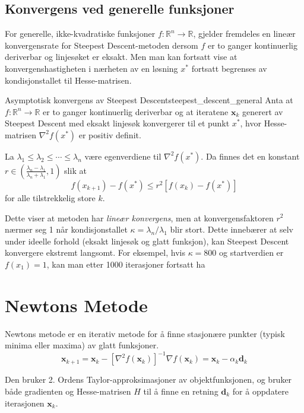 \subsection{Konvergens ved generelle funksjoner}
For generelle, ikke-kvadratiske funksjoner \(f : \mathbb{R}^n \to \mathbb{R}\), gjelder fremdeles en lineær konvergensrate for Steepest Descent-metoden dersom \(f\) er to ganger kontinuerlig deriverbar og linjesøket er eksakt.
Men man kan fortsatt vise at konvergenshastigheten i nærheten av en løsning \(x^\ast\) fortsatt begrenses av kondisjonstallet til Hesse-matrisen.

\begin{theorem}{Asymptotisk konvergens av Steepest Descent}{steepest_descent_general}
	Anta at \(f : \mathbb{R}^n \to \mathbb{R}\) er to ganger kontinuerlig deriverbar og at iteratene \(\symbf{x}_k\) generert av Steepest Descent med eksakt linjesøk konvergerer til et punkt \(x^\ast\), hvor Hesse-matrisen \(\nabla^2 f(x^\ast)\) er positiv definit.

	La \(\lambda_1 \leq \lambda_2 \leq \cdots \leq \lambda_n\) være egenverdiene til \(\nabla^2 f(x^\ast)\). Da finnes det en konstant \(r \in \left( \frac{\lambda_n - \lambda_1}{\lambda_n + \lambda_1}, 1 \right)\) slik at
	\[
		f(x_{k+1}) - f(x^\ast) \leq r^2 \left[ f(x_k) - f(x^\ast) \right]
	\]
	for alle tilstrekkelig store \(k\).
\end{theorem}

Dette viser at metoden har \emph{lineær konvergens}, men at konvergensfaktoren \(r^2\) nærmer seg 1 når kondisjonstallet \(\kappa = \lambda_n / \lambda_1\) blir stort. Dette innebærer at selv under ideelle forhold (eksakt linjesøk og glatt funksjon), kan Steepest Descent konvergere ekstremt langsomt. For eksempel, hvis \(\kappa = 800\) og startverdien er \(f(x_1) = 1\), kan man etter 1000 iterasjoner fortsatt ha

\section{Newtons Metode}
\label{sec:newtons_method}
Newtons metode er en iterativ metode for å finne stasjonære punkter (typisk minima eller maxima) av glatt funksjoner.
\[
	\mathbf{x}_{k+1} = \mathbf{x}_k - [\nabla^2 f(\mathbf{x}_k)]^{-1} \nabla f(\mathbf{x}_k) = \mathbf{x}_k - \alpha_k \mathbf{d}_k
\]\label{eq:newtons_method}

Den bruker 2. Ordens Taylor-approksimasjoner av objektfunksjonen, og bruker både gradienten og Hesse-matrisen $H$ til å finne en retning $\symbf{d}_k$ for å oppdatere iterasjonen $\symbf{x}_k$.


